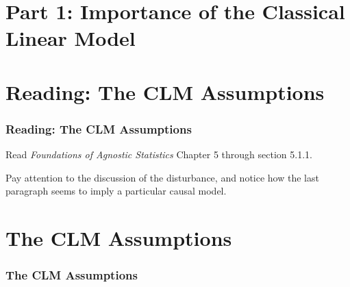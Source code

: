 \documentclass[12pt, block=fill]{beamer}
\begin{document}
\section{Part 1: Importance of the Classical Linear Model}


\section{Reading: The CLM Assumptions}

\begin{frame}
  \frametitle{Reading: The CLM Assumptions}
  Read \textit{Foundations of Agnostic Statistics} Chapter 5 through section 5.1.1.
  
  Pay attention to the discussion of the disturbance, and notice how the last paragraph seems to imply a particular causal model. 
  \end{frame}


\section{The CLM Assumptions}

\begin{frame}
  \frametitle{The CLM Assumptions}

\end{frame}
\end{document}
